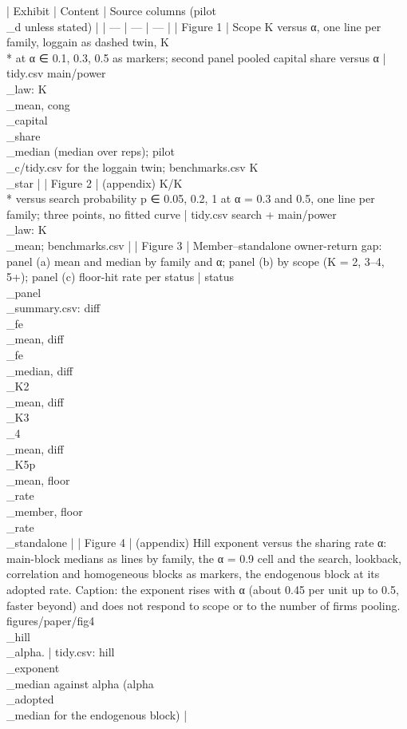 | Exhibit | Content | Source columns (pilot\\_d unless stated) |
| --- | --- | --- |
| Figure 1 | Scope K versus α, one line per family, loggain as dashed twin, K\\* at α ∈ {0.1, 0.3, 0.5} as markers; second panel pooled capital share versus α | tidy.csv main/power\\_law: K\\_mean, cong\\_capital\\_share\\_median (median over reps); pilot\\_c/tidy.csv for the loggain twin; benchmarks.csv K\\_star |
| Figure 2 | (appendix) K/K\\* versus search probability p ∈ {0.05, 0.2, 1} at α = 0.3 and 0.5, one line per family; three points, no fitted curve | tidy.csv search + main/power\\_law: K\\_mean; benchmarks.csv |
| Figure 3 | Member–standalone owner-return gap: panel (a) mean and median by family and α; panel (b) by scope (K = 2, 3–4, 5+); panel (c) floor-hit rate per status | status\\_panel\\_summary.csv: diff\\_fe\\_mean, diff\\_fe\\_median, diff\\_K2\\_mean, diff\\_K3\\_4\\_mean, diff\\_K5p\\_mean, floor\\_rate\\_member, floor\\_rate\\_standalone |
| Figure 4 | (appendix) Hill exponent versus the sharing rate α: main-block medians as lines by family, the α = 0.9 cell and the search, lookback, correlation and homogeneous blocks as markers, the endogenous block at its adopted rate. Caption: the exponent rises with α (about 0.45 per unit up to 0.5, faster beyond) and does not respond to scope or to the number of firms pooling. figures/paper/fig4\\_hill\\_alpha. | tidy.csv: hill\\_exponent\\_median against alpha (alpha\\_adopted\\_median for the endogenous block) |
